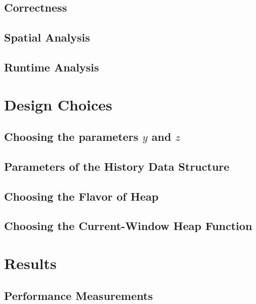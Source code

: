 \documentclass[twoside]{article}
\begin{document}
\begin{multicols}{2}
\subsection{Correctness} \label{sec:Correctness}


\subsection{Spatial Analysis}


\subsection{Runtime Analysis}



\section{Design Choices}

\subsection{Choosing the parameters $y$ and $z$}

\subsection{Parameters of the History Data Structure}

\subsection{Choosing the Flavor of Heap}

\subsection{Choosing the Current-Window Heap Function}


\section{Results}

\subsection{Performance Measurements}


\end{multicols}
\end{document}
